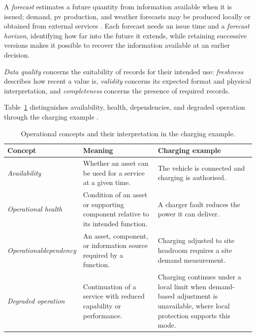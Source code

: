 A \emph{forecast} estimates a future quantity from information available when it is issued; demand, \gls{pv} production, and weather forecasts may be produced locally or obtained from external services \parencite{nweye2025citylearnv2}. Each forecast needs an issue time and a \emph{forecast horizon}, identifying how far into the future it extends, while retaining successive versions makes it possible to recover the information available at an earlier decision.

\emph{Data quality} concerns the suitability of records for their intended use: \emph{freshness} describes how recent a value is, \emph{validity} concerns its expected format and physical interpretation, and \emph{completeness} concerns the presence of required records.

Table~\ref{tab:ch2-operational-conditions} distinguishes availability, health, dependencies, and degraded operation through the charging example \parencite{stouffer2023otsecurity}.

\begin{table}[!htbp]
\centering\small
\caption[Availability, health, dependencies, and degraded operation]{Operational concepts and their interpretation in the charging example.}
\label{tab:ch2-operational-conditions}
\renewcommand{\arraystretch}{1.16}
\begin{tabularx}{\textwidth}{@{}>{\RaggedRight\arraybackslash}p{}>{\RaggedRight\arraybackslash}X>{\RaggedRight\arraybackslash}X@{}}
\toprule
\textbf{Concept} & \textbf{Meaning} & \textbf{Charging example}\\\midrule
\emph{Availability} & Whether an asset can be used for a service at a given time. & The vehicle is connected and charging is authorised.\\\addlinespace[6pt]
\emph{Operational health} & Condition of an asset or supporting component relative to its intended function. & A charger fault reduces the power it can deliver.\\\addlinespace[6pt]
\emph{Operational\newline dependency} & An asset, component, or information source required by a function. & Charging adjusted to site headroom requires a site demand measurement.\\\addlinespace[6pt]
\emph{Degraded operation} & Continuation of a service with reduced capability or performance. & Charging continues under a local limit when demand-based adjustment is unavailable, where local protection supports this mode.\\
\bottomrule
\end{tabularx}
\end{table}

